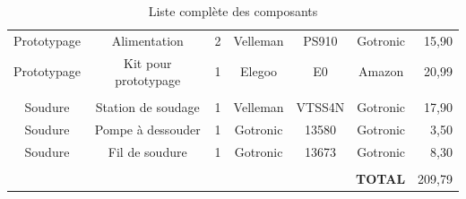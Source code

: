 \documentclass[a4paper, 11pt]{article}
\begin{document}
\begin{table}[h!]
\begin{scriptsize}
\begin{tabular}{ccccccr}
Prototypage & Alimentation & 2 & Velleman & PS910 & Gotronic & 15,90 \\
Prototypage & Kit pour prototypage & 1 & Elegoo & E0 & Amazon & 20,99 \\
 & & & & & & \\
Soudure & Station de soudage & 1 & Velleman & VTSS4N & Gotronic & 17,90 \\
Soudure & Pompe à dessouder & 1 & Gotronic & 13580 & Gotronic & 3,50 \\
Soudure & Fil de soudure & 1 & Gotronic & 13673 & Gotronic & 8,30 \\
 & & & & & & \\
\hline
\multicolumn{6}{r}{\bf TOTAL} & 209,79 \\
\hline
\end{tabular}
\end{scriptsize}
\caption{Liste complète des composants}
\end{table}



\end{document}
